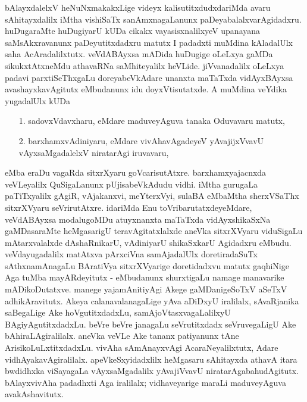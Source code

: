 bAlayxdalelxV heNuNxmakakxLige videyx kalisutitxdudxdariMda avaru sAhitayxdalilx iMtha vishiSaTx sanAmxnagaLanunx paDeyabalalxvarAgidadxru. huDugaraMte huDugiyarU kUDa cikakx vayasisxnalilxyeV upanayana saMsAkxravanunx paDeyutitxdadxru matutx I padadxti muMdina kAladalUlx saha AcAradalilxtutx. veVdABAyxsa mADida huDugige oLeLxya gaMDa sikukxtAtxneMdu athavaRNa saMhiteyalilx heVLide. jiVvanadalilx oLeLxya padavi parxtiSeThxgaLu doreyabeVkAdare unanxta maTaTxda vidAyxBAyxsa avashayxkavAgitutx eMbudanunx idu doyxVtisutatxde. A muMdina veYdika yugadalUlx kUDa 
\begin{enumerate}
\item[{\rm 1.}] sadovxVdavxharu, eMdare maduveyAguva tanaka Oduvavaru matutx,
\item[{\rm 2.}] barxhamxvAdiniyaru, eMdare vivAhavAgadeyeV yAvajijxVvavU vAyxsaMgadalelxV niratarAgi iruvavaru, 
\end{enumerate}
eMba eraDu vagaRda sitxrXyaru goVcarisutAtxre. barxhamxyajacnxda veVLeyalilx QuSigaLanunx pUjisabeVkAdudu vidhi. iMtha gurugaLa paTiTxyalilx gAgiR, vAjakanxvi, meYterxVyi, sulaBA eMbaMtha sherxVSaThx sitxrXVyaru seVrirutAtxre. idariMda Enu toVribarutatxdeyeMdare, veVdABAyxsa modalugoMDu atuyxnanxta maTaTxda vidAyxshikaSxNa gaMDasaraMte heMgasarigU teravAgitatxlalxde aneVka sitxrXVyaru viduSigaLu mAtarxvalalxde dAshaRnikarU, vAdiniyarU shikaSxkarU Agidadxru eMbudu. veVdayugadalilx matAtxva pArxciVna samAjadalUlx doretiradaSuTx sAthxnamAnagaLu BAratiVya sitxrXVyarige doretidadxvu matutx gaqhiNige Aga tuMba mayARdeyitutx - eMbudanunx shurxtigaLu namage manavarike mADikoDutatxve. manege yajamAnitiyAgi Akege gaMDanigeSoTxV aSeTxV adhikAravitutx. Akeya calanavalanagaLige yAva aDiDxyU iralilalx, sAvaRjanika saBegaLige Ake hoVgutitxdadxLu, samAjoVtasxvagaLalilxyU BAgiyAgutitxdadxLu. beVre beVre janagaLu seVrutitxdadx seVruvegaLigU Ake bAhiraLAgiralilalx. aneVka veVLe Ake tananx patiyanunx tAne ArisikoLuLxtitxdadxLu. vivAha sAmAnayxvAgi AcaraNeyalilxtutx, Adare vidhAyakavAgiralilalx. apeVkeSxyidadxlilx heMgasaru sAhitayxda athavA itara bwdidhxka viSayagaLa vAyxsaMgadalilx yAvajiVvavU niratarAgabahudAgitutx. bAlayxvivAha padadhxti Aga iralilalx; vidhaveyarige maraLi maduveyAguva avakAshavitutx. 

